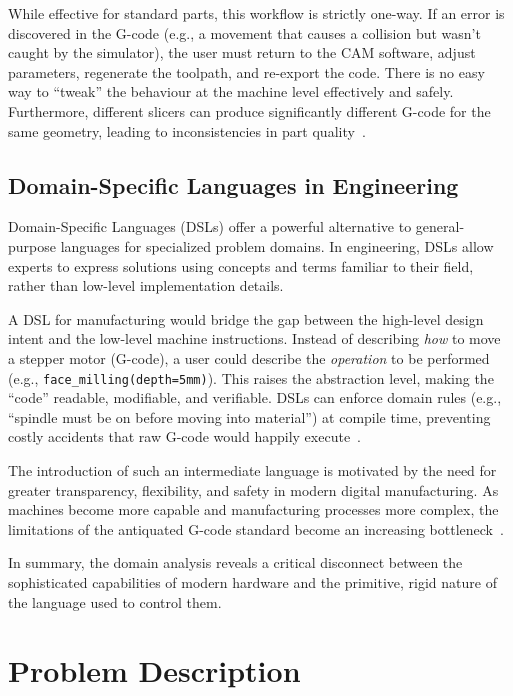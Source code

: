 While effective for standard parts, this workflow is strictly one-way. If an error is discovered in the G-code (e.g., a movement that causes a collision but wasn't caught by the simulator), the user must return to the CAM software, adjust parameters, regenerate the toolpath, and re-export the code. There is no easy way to ``tweak'' the behaviour at the machine level effectively and safely. Furthermore, different slicers can produce significantly different G-code for the same geometry, leading to inconsistencies in part quality~\cite{beyer_slicer-independent_2026-1, bryla_study_2021}.

\subsection{Domain-Specific Languages in Engineering}

Domain-Specific Languages (DSLs) offer a powerful alternative to general-purpose languages for specialized problem domains. In engineering, DSLs allow experts to express solutions using concepts and terms familiar to their field, rather than low-level implementation details.

A DSL for manufacturing would bridge the gap between the high-level design intent and the low-level machine instructions. Instead of describing \textit{how} to move a stepper motor (G-code), a user could describe the \textit{operation} to be performed (e.g., \texttt{face\_milling(depth=5mm)}). This raises the abstraction level, making the ``code'' readable, modifiable, and verifiable. DSLs can enforce domain rules (e.g., ``spindle must be on before moving into material'') at compile time, preventing costly accidents that raw G-code would happily execute~\cite{zhang_still_2026}.

The introduction of such an intermediate language is motivated by the need for greater transparency, flexibility, and safety in modern digital manufacturing. As machines become more capable and manufacturing processes more complex, the limitations of the antiquated G-code standard become an increasing bottleneck~\cite{arroyo_generating_2011, noauthor_auto-seg_2026}.

In summary, the domain analysis reveals a critical disconnect between the sophisticated capabilities of modern hardware and the primitive, rigid nature of the language used to control them.

\section{Problem Description}

